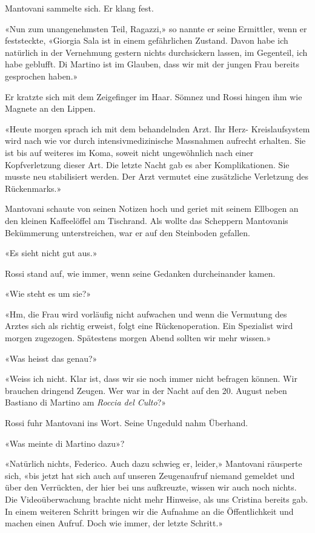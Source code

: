 Mantovani sammelte sich. Er klang fest.

«Nun zum unangenehmsten Teil, Ragazzi,» so nannte er seine Ermittler,
wenn er feststeckte, «Giorgia Sala ist in einem gefährlichen Zustand.
Davon habe ich natürlich in der Vernehmung gestern nichts durchsickern
lassen, im Gegenteil, ich habe geblufft. Di Martino ist im Glauben, dass
wir mit der jungen Frau bereits gesprochen haben.»

Er kratzte sich mit dem Zeigefinger im Haar. Sömnez und Rossi hingen ihm
wie Magnete an den Lippen.

«Heute morgen sprach ich mit dem behandelnden Arzt. Ihr Herz-
Kreislaufsystem wird nach wie vor durch intensivmedizinische Massnahmen
aufrecht erhalten. Sie ist bis auf weiteres im Koma, soweit nicht
ungewöhnlich nach einer Kopfverletzung dieser Art. Die letzte Nacht gab
es aber Komplikationen. Sie musste neu stabilisiert werden. Der Arzt
vermutet eine zusätzliche Verletzung des Rückenmarks.»

Mantovani schaute von seinen Notizen hoch und geriet mit seinem Ellbogen
an den kleinen Kaffeelöffel am Tischrand. Als wollte das Scheppern
Mantovanis Bekümmerung unterstreichen, war er auf den Steinboden
gefallen.

«Es sieht nicht gut aus.»

Rossi stand auf, wie immer, wenn seine Gedanken durcheinander kamen.

«Wie steht es um sie?»

«Hm, die Frau wird vorläufig nicht aufwachen und wenn die Vermutung des
Arztes sich als richtig erweist, folgt eine Rückenoperation. Ein
Spezialist wird morgen zugezogen. Spätestens morgen Abend sollten wir
mehr wissen.»

«Was heisst das genau?»

«Weiss ich nicht. Klar ist, dass wir sie noch immer nicht befragen
können. Wir brauchen dringend Zeugen. Wer war in der Nacht auf den 20.
August neben Bastiano di Martino am \emph{Roccia del Culto}?»

Rossi fuhr Mantovani ins Wort. Seine Ungeduld nahm Überhand.

«Was meinte di Martino dazu»?

«Natürlich nichts, Federico. Auch dazu schwieg er, leider,» Mantovani
räusperte sich, «bis jetzt hat sich auch auf unseren Zeugenaufruf
niemand gemeldet und über den Verrückten, der hier bei uns aufkreuzte,
wissen wir auch noch nichts. Die Videoüberwachung brachte nicht mehr
Hinweise, als uns Cristina bereits gab. In einem weiteren Schritt
bringen wir die Aufnahme an die Öffentlichkeit und machen einen Aufruf.
Doch wie immer, der letzte Schritt.»

